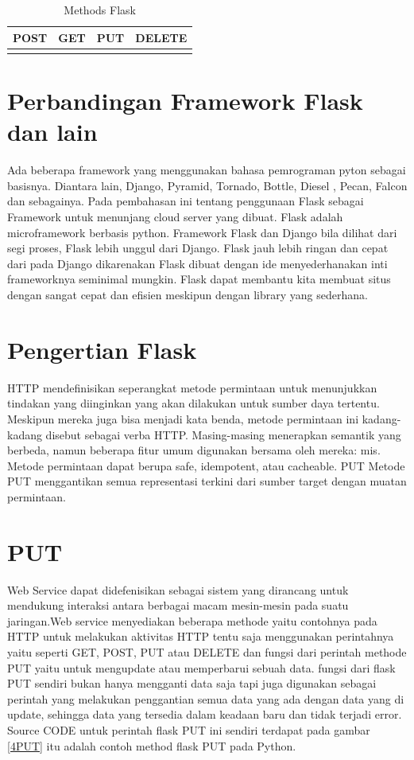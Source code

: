 \begin{table}[h]
    \caption{Methods Flask}
    \centering
    \begin{tabular}{cccc}
    \hline
    POST&GET&PUT&DELETE\\
    \hline
    \label{methods}
    \end{tabular}
\end{table}

\section{Perbandingan Framework Flask dan lain}
Ada beberapa framework yang menggunakan bahasa pemrograman pyton sebagai basisnya. Diantara lain, Django, Pyramid, Tornado, Bottle, Diesel , Pecan, Falcon dan sebagainya.
Pada pembahasan ini tentang penggunaan Flask sebagai Framework untuk menunjang cloud server yang dibuat. 
Flask adalah microframework berbasis python. Framework Flask dan Django bila dilihat dari segi proses, Flask lebih unggul dari Django. 
Flask jauh lebih ringan dan cepat dari pada Django dikarenakan Flask dibuat dengan ide menyederhanakan inti frameworknya seminimal mungkin. 
Flask dapat membantu kita membuat situs dengan sangat cepat dan efisien meskipun dengan library yang sederhana.

\section{Pengertian Flask}
HTTP mendefinisikan seperangkat metode permintaan untuk menunjukkan tindakan yang diinginkan yang akan dilakukan untuk sumber daya tertentu. Meskipun mereka juga bisa menjadi kata benda, metode permintaan ini kadang-kadang disebut sebagai verba HTTP. Masing-masing menerapkan semantik yang berbeda, namun beberapa fitur umum digunakan bersama oleh mereka: mis. Metode permintaan dapat berupa safe, idempotent, atau cacheable.
PUT
Metode PUT menggantikan semua representasi terkini dari sumber target dengan muatan permintaan.

\section{PUT}
Web Service dapat didefenisikan sebagai sistem yang dirancang untuk mendukung interaksi antara berbagai macam mesin-mesin pada suatu jaringan.Web service menyediakan beberapa methode yaitu contohnya pada  HTTP untuk melakukan aktivitas HTTP tentu saja menggunakan perintahnya yaitu seperti  GET, POST, PUT atau DELETE dan fungsi dari perintah methode PUT yaitu untuk mengupdate atau memperbarui sebuah data.
fungsi dari flask PUT sendiri bukan hanya mengganti data saja tapi
juga digunakan sebagai perintah yang melakukan
penggantian semua data yang ada dengan data yang di update, sehingga
data yang tersedia dalam keadaan baru dan tidak terjadi error.
Source CODE untuk perintah flask PUT ini sendiri terdapat pada gambar \ref{4PUT} 
itu adalah contoh method flask PUT pada Python.


